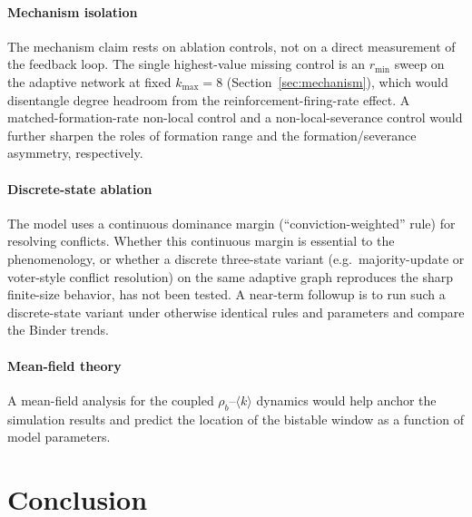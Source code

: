 \documentclass[preprint,12pt]{elsarticle}
\newcommand{\rb}{\rho_b}              %
\newcommand{\kavg}{\langle k \rangle} %
\newcommand{\rmin}{r_{\min}}           %
\newcommand{\kmax}{k_{\max}}           %
\begin{document}
\paragraph{Mechanism isolation}
The mechanism claim rests on ablation controls, not on a
direct measurement of the feedback loop.
The single highest-value missing control is an $\rmin$
sweep on the adaptive network at fixed $\kmax = 8$
(Section~\ref{sec:mechanism}), which would disentangle
degree headroom from the reinforcement-firing-rate effect.
A matched-formation-rate non-local control and a
non-local-severance control would further sharpen the
roles of formation range and the formation/severance
asymmetry, respectively.

\paragraph{Discrete-state ablation}
The model uses a continuous dominance margin
(``conviction-weighted'' rule) for resolving conflicts.
Whether this continuous margin is essential to the
phenomenology, or whether a discrete three-state variant
(e.g.\ majority-update or voter-style conflict resolution)
on the same adaptive graph reproduces the sharp finite-size
behavior, has not been tested.
A near-term followup is to run such a discrete-state variant
under otherwise identical rules and parameters and compare
the Binder trends.

\paragraph{Mean-field theory}
A mean-field analysis for the coupled $\rb$--$\kavg$
dynamics would help anchor the simulation results and
predict the location of the bistable window as a function
of model parameters.

\section{Conclusion}
\label{sec:conclusion}
\end{document}
